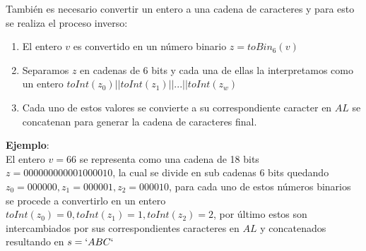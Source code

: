 También es necesario convertir un entero a una cadena de caracteres y para esto se realiza el proceso inverso:
\begin{enumerate}
 \item El entero $v$ es convertido en un número binario  $z=toBin_6(v)$ 
 \item Separamos $z$ en cadenas de 6 bits y cada una de ellas la interpretamos como un entero $toInt(z_0)||toInt(z_1)||...||toInt(z_w)$
 \item Cada uno de estos valores se convierte a su correspondiente caracter en $AL$ se concatenan para generar la cadena de caracteres final.
\end{enumerate}
\textbf{Ejemplo}:\\
El entero $v=66$ se representa como una cadena de 18 bits $z=000000000001000010$, la cual se divide en sub cadenas 6 bits quedando $z_0=000000, z_1=000001, z_2=000010$, para cada uno de estos números binarios se procede a convertirlo en un entero $toInt(z_0)=0, toInt(z_1)=1, toInt(z_2)=2$, por último estos son intercambiados por sus correspondientes caracteres en $AL$ y concatenados resultando en $s=`ABC`$




        
